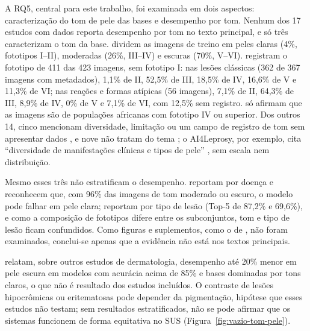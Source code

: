 A RQ5, central para este trabalho, foi examinada em dois aspectos:
caracterização do tom de pele das bases e desempenho por tom. Nenhum dos
17 estudos com dados reporta desempenho por tom no texto principal, e só
três caracterizam o tom da base.  dividem as imagens
de treino em peles claras (4\%, fototipos I--II), moderadas (26\%,
III--IV) e escuras (70\%, V--VI).  registram o
fototipo de 411 das 423 imagens, sem fototipo I: nas lesões clássicas (362
de 367 imagens com metadados), 1,1\% de II, 52,5\% de III, 18,5\% de IV,
16,6\% de V e 11,3\% de VI; nas reações e formas atípicas (56 imagens),
7,1\% de II, 64,3\% de III, 8,9\% de IV, 0\% de V e 7,1\% de VI, com
12,5\% sem registro.  só afirmam que as imagens são
de populações africanas com fototipo IV ou superior. Dos outros 14, cinco
mencionam diversidade, limitação ou um campo de registro de tom sem
apresentar dados
\cite{jitendra2024deep,barbieri2022,beesetty2023,jitendra2024heuristic,eita2025},
e nove não tratam do tema
\cite{nyatte2022,vargasclavijo2025,baweja2023,gawali2024,sanchez2024,mehta2026,jaikishore2021,banerjee2023,lima2024skin}; o AI4Leprosy, por exemplo,
cita ``diversidade de manifestações clínicas e tipos de pele''
\cite[seção Introdução, tradução nossa]{barbieri2022}, sem escala nem
distribuição.

Mesmo esses três não estratificam o desempenho. 
reportam por doença e reconhecem que, com 96\% das imagens de tom moderado
ou escuro, o modelo pode falhar em pele clara; 
reportam por tipo de lesão (Top-5 de 87,2\% e 69,6\%), e como a
composição de fototipos difere entre os subconjuntos, tom e tipo de lesão
ficam confundidos. Como figuras e suplementos, como o de , não
foram examinados, conclui-se apenas que a evidência não está nos textos
principais.

 relatam, sobre outros estudos de dermatologia,
desempenho até 20\% menor em pele escura em modelos com acurácia acima de
85\% e bases dominadas por tons claros, o que não é resultado dos estudos
incluídos. O contraste de lesões hipocrômicas ou eritematosas pode
depender da pigmentação, hipótese que esses estudos não testam; sem
resultados estratificados, não se pode afirmar que os sistemas funcionem
de forma equitativa no SUS (Figura~\ref{fig:vazio-tom-pele}).

